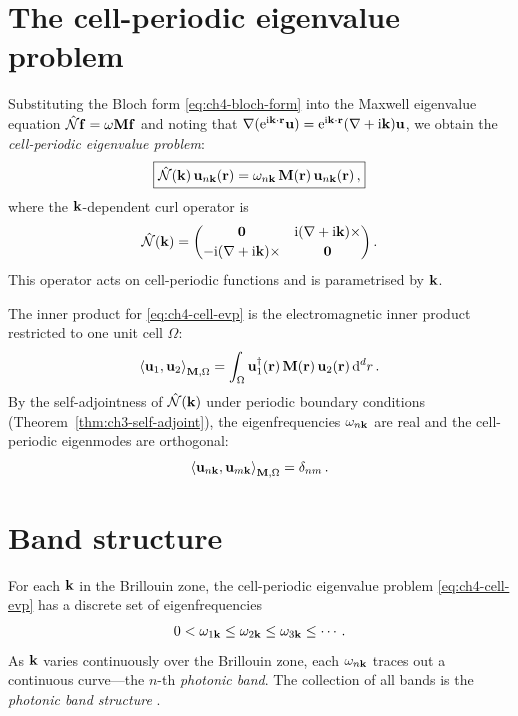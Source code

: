 \section{The cell-periodic eigenvalue problem}
\label{sec:ch4-cell-evp}

Substituting the Bloch form \eqref{eq:ch4-bloch-form} into the Maxwell
eigenvalue equation $\hat{\mathcal{N}}\mathbf{f}=\omega\mathbf{M}\mathbf{f}$ and noting
that $\nabla(\mathrm{e}^{\mathrm{i}\mathbf{k}\cdot\mathbf{r}}\mathbf{u})
=\mathrm{e}^{\mathrm{i}\mathbf{k}\cdot\mathbf{r}}(\nabla+\mathrm{i}\mathbf{k})\mathbf{u}$, we obtain the
\emph{cell-periodic eigenvalue problem}:
\begin{equation}\label{eq:ch4-cell-evp}
  \boxed{%
  \Maxop(\kvec)\,\mathbf{u}_{n\kvec}(\rvec)
  = \omega_{n\kvec}\,\Mmat(\rvec)\,\mathbf{u}_{n\kvec}(\rvec)\,,}
\end{equation}
where the $\mathbf{k}$-dependent curl operator is
\begin{equation}\label{eq:ch4-maxop-k}
  \hat{\mathcal{N}}(\mathbf{k}) =
  \begin{pmatrix}
    \mathbf{0} & \mathrm{i}(\nabla+\mathrm{i}\mathbf{k})\times \\[2pt]
    -\mathrm{i}(\nabla+\mathrm{i}\mathbf{k})\times & \mathbf{0}
  \end{pmatrix}.
\end{equation}
This operator acts on cell-periodic functions and is parametrised by
$\mathbf{k}$.

The inner product for \eqref{eq:ch4-cell-evp} is the electromagnetic
inner product restricted to one unit cell $\Omega$:
\begin{equation}\label{eq:ch4-cell-ip}
  \left\langle \mathbf{u}_1,\mathbf{u}_2\right\rangle_{\mathbf{M},\Omega}
  = \int_\Omega
  \mathbf{u}_1^\dagger(\mathbf{r})\,\mathbf{M}(\mathbf{r})\,
  \mathbf{u}_2(\mathbf{r})\,\mathrm{d}^d r\,.
\end{equation}
By the self-adjointness of $\hat{\mathcal{N}}(\mathbf{k})$ under periodic boundary
conditions (Theorem~\ref{thm:ch3-self-adjoint}), the eigenfrequencies
$\omega_{n\mathbf{k}}$ are real and the cell-periodic eigenmodes are
orthogonal:
\begin{equation}\label{eq:ch4-cell-orth}
  \left\langle \mathbf{u}_{n\mathbf{k}},\mathbf{u}_{m\mathbf{k}}\right\rangle_{\mathbf{M},\Omega}
  = \delta_{nm}\,.
\end{equation}

\section{Band structure}
\label{sec:ch4-bands}

For each $\mathbf{k}$ in the Brillouin zone, the cell-periodic eigenvalue
problem \eqref{eq:ch4-cell-evp} has a discrete set of eigenfrequencies
\begin{equation}
  0 < \omega_{1\mathbf{k}} \leq \omega_{2\mathbf{k}} \leq \omega_{3\mathbf{k}}
  \leq \cdots\,.
\end{equation}
As $\mathbf{k}$ varies continuously over the Brillouin zone, each
$\omega_{n\mathbf{k}}$ traces out a continuous curve---the $n$-th
\emph{photonic band}.  The collection of all bands is the
\emph{photonic band structure} \cite{wu2015scheme,paz2019tutorial,ho1990existence}.

